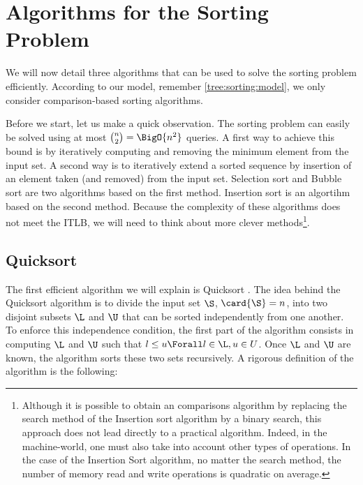 \section{Algorithms for the Sorting Problem}
\label{tree:sorting:alg}

We will now detail three algorithms that can be used to solve the sorting
problem efficiently. According to our model, remember \ref{tree:sorting:model},
we only consider comparison-based sorting algorithms.


Before we start, let us make a quick observation. The sorting problem can
easily be solved using at most \(\binom{n}{2} = \BigO{n^2}\) queries. A first
way to achieve this bound is by iteratively computing and removing the minimum
element from the input set. A second way is to iteratively
extend a sorted sequence by insertion of an element taken (and removed) from
the input set. Selection sort and Bubble sort are two algorithms based on the
first method. Insertion sort is an algortihm based on the second method.
Because the complexity of these algorithms does not meet the ITLB, we will need
to think about more clever methods\footnote{Although it is possible to obtain
an  comparisons algorithm by replacing the search method of the
Insertion sort algorithm by a binary search, this approach does not lead directly
to a practical algorithm. Indeed, in the machine-world, one must also take
into account other types of operations. In the case of the Insertion Sort
algorithm, no matter the search method, the number of memory read and write
operations is quadratic on average.}.

\subsection*{Quicksort}

The first efficient algorithm we will explain is Quicksort \cite{hoare:1962}.
The idea behind the Quicksort algorithm is to divide the input set \(\S\),
\(\card{\S} = n\), into two disjoint subsets \(\L\) and \(\U\) that can be
sorted independently from one another. To enforce this independence condition,
the first part of the algorithm consists in computing \(\L\) and \(\U\) such
that \(l \le u \Forall l \in \L, u \in U\). Once \(\L\) and \(\U\) are known,
the algorithm sorts these two sets recursively. A rigorous definition of the
algorithm is the following:

